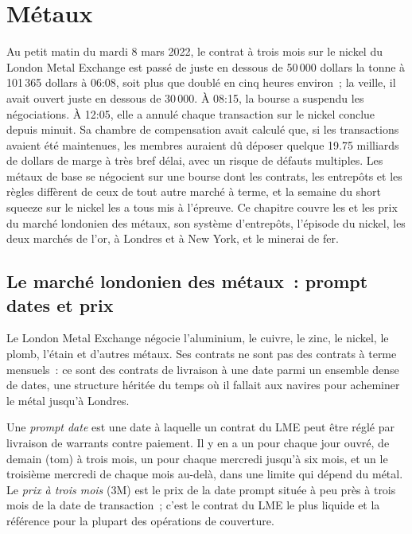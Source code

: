 \chapter{Métaux}\label{ch:m3:metals}

Au petit matin du mardi 8 mars 2022, le contrat à trois mois sur le nickel du London
Metal Exchange est passé de juste en dessous de 50\,000 dollars la tonne à 101\,365 dollars à
06:08, soit plus que doublé en cinq heures environ~; la veille, il avait ouvert juste en dessous
de 30\,000. À 08:15, la bourse a suspendu les négociations. À 12:05, elle a annulé chaque transaction sur le nickel
conclue depuis minuit. Sa chambre de compensation avait calculé que, si les transactions avaient été maintenues, les membres auraient dû
déposer quelque 19.75 milliards de dollars de marge à très bref délai, avec un risque de
défauts multiples. Les métaux de base se négocient sur une bourse dont les contrats, les entrepôts et les règles
diffèrent de ceux de tout autre marché à terme, et la semaine du short squeeze sur le nickel
les a tous mis à l'épreuve. Ce chapitre couvre les  et les prix du marché londonien des métaux, son système
d'entrepôts, l'épisode du nickel, les deux marchés de l'or, à Londres et à New York, et le minerai de fer.

\section{Le marché londonien des métaux~: prompt dates et prix}

Le London Metal Exchange négocie l'aluminium, le cuivre, le zinc, le nickel, le plomb, l'étain et d'autres
métaux. Ses contrats ne sont pas des contrats à terme mensuels~: ce sont des contrats de livraison à une date
parmi un ensemble dense de dates, une structure héritée du temps où il fallait aux navires
pour acheminer le métal jusqu'à Londres.

\begin{definition}\label{def:m3:metals:prompt}
Une \emph{prompt date} est une date à laquelle un contrat du LME peut être réglé par
livraison de warrants contre paiement. Il y en a un pour chaque jour ouvré, de demain
(tom) à trois mois, un pour chaque mercredi jusqu'à six mois, et un le
troisième mercredi de chaque mois au-delà, dans une limite qui dépend du métal. Le
\emph{prix à trois mois} (3M) est le prix de la date prompt située à peu près
à trois mois de la date de transaction~; c'est le contrat du LME le plus liquide et la référence pour
la plupart des opérations de couverture.
\end{definition}

